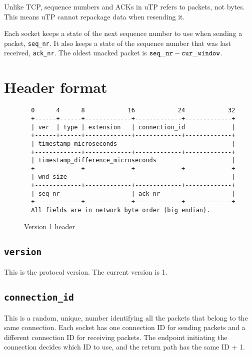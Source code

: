 \documentclass[11pt,a4paper,oneside,draft]{article}
\begin{document}
Unlike TCP, sequence numbers and ACKs in uTP refers to packets, not bytes. This means uTP cannot repackage data when resending it.

Each socket keeps a state of the next sequence number to use when sending a packet, {\tt seq\_nr}. It also keeps a state of the sequence number that was last received, {\tt ack\_nr}. The oldest unacked packet is ${\tt seq\_nr} - {\tt cur\_window}$.

{\section {Header format}}

{\begin{figure}
{\begin{verbatim}
  0      4      8            16            24            32
  +------+------+-------------+-------------+-------------+
  | ver  | type | extension   | connection_id             |
  +------+------+-------------+-------------+-------------+
  | timestamp_microseconds                                |
  +-------------+-------------+-------------+-------------+
  | timestamp_difference_microseconds                     |
  +-------------+-------------+-------------+-------------+
  | wnd_size                                              |
  +-------------+-------------+-------------+-------------+
  | seq_nr                    | ack_nr                    |
  +-------------+-------------+-------------+-------------+
  All fields are in network byte order (big endian).
\end{verbatim}}
\caption{Version 1 header}
\end{figure}}

{\subsection {{\tt version}}}

This is the protocol version. The current version is 1.

{\subsection {{\tt connection\_id}}}

This is a random, unique, number identifying all the packets that belong to the same connection. Each socket has one connection ID for sending packets and a different connection ID for receiving packets. The endpoint initiating the connection decides which ID to use, and the return path has the same ID + 1.
\end{document}
